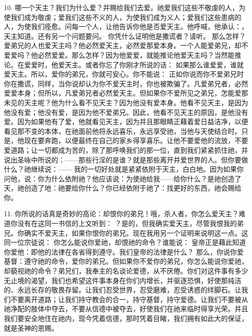10.   哪一个天主？我们为什么爱？并赐给我们去爱。祂爱我们这些不敬虔的人，为使我们成为敬虔；爱我们这些不义的人，为使我们成为义人；爱我们这些患病的人，为使我们痊愈。问每一个人，让他告诉你他是否爱天主。他呼喊，他承认：，天主知道。还有另一个问题要问。 你凭什么证明他是撒谎者？请听。 那么怎样？爱弟兄的人也爱天主吗？他必然爱天主，必然爱那爱本身。一个人能爱弟兄，却不爱爱吗？他必然爱爱。那么怎样？因为他爱爱，就能推论他爱天主吗？当然能推论。在爱爱时，他爱天主。或者你忘了你刚才所说的话：  如果那么谁爱爱，谁就爱天主。所以，爱你的弟兄，你就可安心。你不能说： 正如你说而你不爱弟兄时你在撒谎，同样，当你说却认为你不爱天主时，你也被欺骗了。凡爱弟兄者，必然爱爱本身；但所以，凡爱弟兄者必然爱天主。但如果你不爱所见之弟兄，怎能爱那未见的天主呢？他为什么看不见天主？因为他没有爱本身。他看不见天主，是因为他没有爱；他没有爱，是因为他不爱弟兄。因此，他看不见天主的原因，是他没有爱。因为如果他有了爱，他就看见天主，因为并且那眼睛正藉着爱日益洁净，以便看见那不变的本体，在祂面前他将永远喜乐，永远享受祂，当他与天使结合时。只是，他现在要奔跑，以便最终在自己的家乡得享喜乐。让他不要爱他的流放，不要爱道路；让一切都成为苦的，除了那呼唤我们的那一位，直到我们紧紧抓住祂，并说出圣咏中所说的：——那些行淫的是谁？就是那些离开并爱世界的人。但你要做什么？祂继续说：—— 我的一切好处就是紧紧依附于天主，白白地。因为如果你问他，说：你为什么依附祂？他应该说：为使祂给我——给你什么？是祂创造了天，祂创造了地：祂要给你什么？你已经依附于祂了：找更好的东西，祂会赐给你。\par

11.   你所说的话真是奇妙的高论：却恨你的弟兄！哦，杀人者，你怎么爱天主？难道你没有在这同一书信的上文听到： ？是的，但我确实爱天主，尽管我恨我的弟兄。你确实不爱天主，如果你恨你的弟兄。现在我用另一个证明来说明这一点。这同一位宗徒说： 你怎么能说你爱祂，却恨祂的命令？谁能说： 皇帝正是藉此知道你爱他：即他的法律在各省得到遵守。我们皇帝的法律是什么？  那么，你说你爱基督：遵守祂的命令，爱你的弟兄。但如果你不爱你的弟兄，你怎么能说你爱祂，却藐视祂的命令？弟兄们，我奉主的名谈论爱德，从不厌倦。你们对这件事有多少无止境的渴望，我们也希望这件事本身在你们内增长，并驱逐恐惧，好使那纯洁的、永远长存的敬畏存留。让我们忍受世界，忍受磨难，忍受诱惑的绊脚石。让我们不要离开道路；让我们持守教会的合一，持守基督，持守爱德。让我们不要被从祂净配的肢体中夺去，不要从信德中被夺去，好使我们在祂来临时得享光荣。并且我们要安全地住在祂内，现今凭着信德，那时凭着目睹，我们拥有如此大的保证，就是圣神的恩赐。\par

